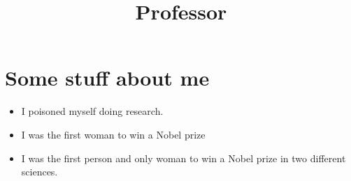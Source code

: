 \documentclass[11pt,a4paper,]{moderncv}
\title{Professor} %
\providecommand{\tightlist}{%
	\setlength{\itemsep}{0pt}\setlength{\parskip}{0pt}}
\begin{document}
\makecvtitle %



\section{Some stuff about me}\label{some-stuff-about-me}

\begin{itemize}
\tightlist
\item
  I poisoned myself doing research.
\item
  I was the first woman to win a Nobel prize
\item
  I was the first person and only woman to win a Nobel prize in two
  different sciences.
\end{itemize}
\end{document}
